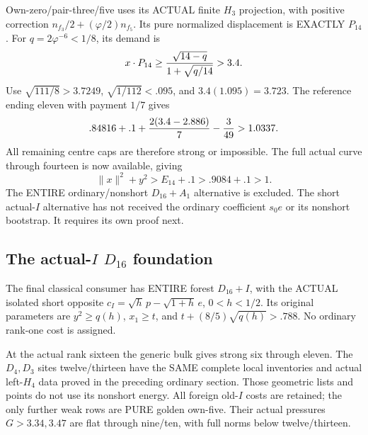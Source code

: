 \documentclass[11pt]{article}
\begin{document}
Own-zero/pair-three/five uses its ACTUAL
finite \(H_3\) projection, with positive
correction \(n_{f_3}/2+(\varphi/2)n_{f_5}\).
Its pure normalized displacement is
EXACTLY \(P_{14}\).
For \(q=2\varphi^{-6}<1/8\), its demand is
\[
                  x\cdot P_{14}\ge
                  {\sqrt{14-q}\over1+\sqrt{q/14}}>3.4 .
\]
Use \(\sqrt{111/8}>3.7249\),
\(\sqrt{1/112}<.095\), and
\(3.4(1.095)=3.723\).
The reference ending eleven with
payment \(1/7\) gives
\[
                    .84816+.1+{2(3.4-2.886)\over7}-{3\over49}>1.0337 .
\]
All remaining centre caps are therefore
strong or impossible.
The full actual curve through fourteen
is now available, giving
\[
                        \|x\|^2+y^2>E_{14}+.1>.9084+.1>1 .
\]
The ENTIRE ordinary/nonshort \(D_{16}+A_1\)
alternative is excluded.
The short actual-\(I\) alternative has
not received the ordinary coefficient
\(s_0e\) or its nonshort bootstrap.
It requires its own proof next.

\subsection{The actual-\(I\) \(D_{16}\) foundation}
\label{app:arithD16Ifoundation}

The final classical consumer has ENTIRE
forest \(D_{16}+I\), with the ACTUAL
isolated short opposite
\(c_I=\sqrt h\,p-\sqrt{1+h}\,e\),
\(0<h<1/2\).
Its original parameters are
\(y^2\ge q(h)\), \(x_1\ge t\), and
\(t+(8/5)\sqrt{q(h)}>.788\).
No ordinary rank-one cost is assigned.

At the actual rank sixteen the generic
bulk gives strong six through eleven.
The \(D_4,D_3\) sites twelve/thirteen
have the SAME complete local inventories
and actual left-\(H_4\) data proved in
the preceding ordinary section.
Those geometric lists and points do
not use its nonshort energy.
All foreign old-\(I\) costs are retained;
the only further weak rows are PURE
golden own-five.
Their actual pressures \(G>3.34,3.47\)
are flat through nine/ten, with full
norms below twelve/thirteen.
\end{document}
